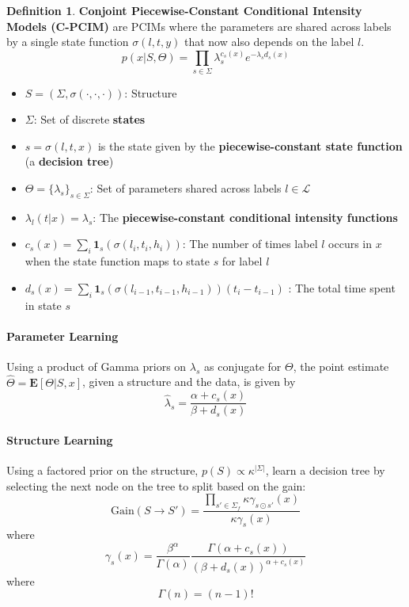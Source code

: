 \documentclass[12pt]{article}
\theoremstyle{plain}
\theoremstyle{definition}
\newtheorem{definition}{Definition}
\theoremstyle{remark}
\begin{document}
\begin{definition}
  \textbf{Conjoint Piecewise-Constant Conditional Intensity Models (C-PCIM)} are
  PCIMs where the parameters are shared across labels by a single state function
  $\sigma(l,t,y)$ that now also depends on the label $l$.
  \begin{equation*}
    p(x|S,\Theta) = \prod_{s\in\Sigma}\lambda_{s}^{c_{s}(x)}
    e^{-\lambda_{s}d_{s}(x)}
  \end{equation*}
  \begin{itemize}
    \item $S=\left(\Sigma,\sigma(\cdot,\cdot,\cdot)\right)$: Structure
    \item $\Sigma$: Set of discrete \textbf{states}
    \item $s=\sigma(l,t,x)$ is the state given by the
      \textbf{piecewise-constant state function} (a \textbf{decision tree})
    \item $\Theta=\{\lambda_s\}_{s\in\Sigma}$: Set of parameters shared across
      labels $l \in \mathcal{L}$
    \item $\lambda_l(t|x)=\lambda_{s}$:
      The \textbf{piecewise-constant conditional intensity functions}
    \item $c_{s}(x)= \sum_i\mathbf{1}_s(\sigma(l_i,t_i,h_i))$:
      The number of times label $l$ occurs in $x$ when the state function maps
      to state $s$ for label $l$
    \item $d_{s}(x) = \sum_{i}\mathbf{1}_s(\sigma(l_{i-1},t_{i-1},h_{i-1}))(t_i-t_{i-1})$
      : The total time spent in state $s$
  \end{itemize}
\end{definition}

\paragraph{Parameter Learning}
Using a product of Gamma priors on $\lambda_s$ as conjugate for $\Theta$,
the point estimate $\hat{\Theta} = \mathbf{E}[\Theta|S,x]$, given a structure
and the data, is given by
\begin{equation*}
  \hat{\lambda}_s = \frac{\alpha + c_s(x)}{\beta + d_s(x)}
\end{equation*}

\paragraph{Structure Learning}
Using a factored prior on the structure, $p(S) \propto \kappa^{|\Sigma|}$,
learn a decision tree \citep{chihecmee97} by selecting the next node on the tree
to split based on the gain:
\begin{equation*}
  \mathrm{Gain}(S \to S') =
  \frac{\prod_{s'\in\Sigma_f}\kappa\gamma_{s \odot s'}(x)}{\kappa\gamma_s(x)}
\end{equation*}
where
\begin{equation*}
  \gamma_s(x) =
  \frac{\beta^{\alpha}}{\Gamma(\alpha)}\frac{\Gamma(\alpha + c_s(x))}{(\beta + d_s(x))^{\alpha + c_s(x)}}
\end{equation*}
where
\begin{equation*}
  \Gamma(n) = (n-1)!
\end{equation*}
\end{document}
